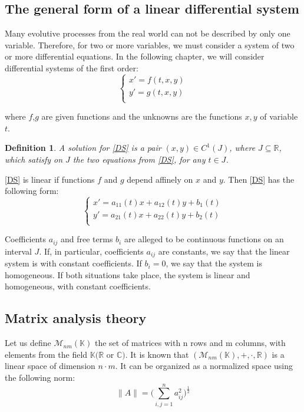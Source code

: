 \documentclass[a4paper,12pt]{report}
\newtheorem{definition}{Definition}[subsection]
\newcommand{\R}{\mathbb{R}}
\begin{document}
\subsection{The general form of a linear differential system}
Many evolutive processes from the real world can not be described by only one variable. Therefore, for two or more variables, we must consider a system 
of two or more differential equations. In the following chapter, we will consider differential systems of the first order:
\begin{equation}
\begin{cases}
 x'=f(t,x,y)\\ 
 y'=g(t,x,y)\\
\end{cases}
 \label{DS}\tag{DS}
\end{equation}

where $f$,$g$ are given functions and the unknowns are the functions $x,y$ of variable $t$. \\

\begin{definition} 
A solution for \eqref{DS} is a pair $(x,y)\in C^{1}(J)$, where $J\subseteq \R$, which satisfy on $J$ the two equations from \eqref{DS}, for 
any $t\in J$. 
\end{definition}
 
\eqref{DS} is linear if functions $f$ and $g$ depend affinely on $x$ and $y$. Then \eqref{DS} has the following form:
\begin{equation}
 \begin{cases}
  x'=a_{11}(t)x+a_{12}(t)y+b_{1}(t)\\
  y'=a_{21}(t)x+a_{22}(t)y+b_{2}(t)\\
 \end{cases}
\label{DS*}\tag{DS*}
\end{equation}

Coefficients $a_{ij}$ and free terms $b_{i}$ are alleged to be continuous functions on an interval $J$. If, in particular, coefficients $a_{ij}$
are constants, we say that the linear system is with constant coefficients. If $b_{i}=0$, we say that the system is homogeneous. If both situations
take place, the system is linear and homogeneous, with constant coefficients.

\subsection{Matrix analysis theory}

Let us define $\mathcal{M}_{nm}(\mathbb{K})$ the set of matrices with n rows and m columns, with elements from the field $\mathbb{K} (\R$ or $\mathbb{C})$. It is known that $(\mathcal{M}_{nm}(\mathbb{K}), +, \cdot, \R)$ is a linear space of dimension $n\cdot m$. It can be organized as a normalized space using the following norm:
\begin{equation*}
 \rVert A \rVert = \bigg( \sum_{i,j=1}^{n} a_{ij}^{2} \bigg)^\frac{1}{2}
\end{equation*}
\end{document}
